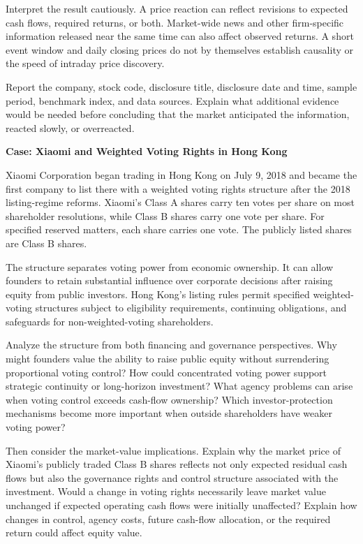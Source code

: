 Interpret the result cautiously. A price reaction can reflect revisions to expected cash flows, required returns, or both. Market-wide news and other firm-specific information released near the same time can also affect observed returns. A short event window and daily closing prices do not by themselves establish causality or the speed of intraday price discovery.

Report the company, stock code, disclosure title, disclosure date and time, sample period, benchmark index, and data sources. Explain what additional evidence would be needed before concluding that the market anticipated the information, reacted slowly, or overreacted.



\textbf{Case: Xiaomi and Weighted Voting Rights in Hong Kong}

Xiaomi Corporation began trading in Hong Kong on July 9, 2018 and became the first company to list there with a weighted voting rights structure after the 2018 listing-regime reforms. Xiaomi's Class A shares carry ten votes per share on most shareholder resolutions, while Class B shares carry one vote per share. For specified reserved matters, each share carries one vote. The publicly listed shares are Class B shares.

The structure separates voting power from economic ownership. It can allow founders to retain substantial influence over corporate decisions after raising equity from public investors. Hong Kong's listing rules permit specified weighted-voting structures subject to eligibility requirements, continuing obligations, and safeguards for non-weighted-voting shareholders.

Analyze the structure from both financing and governance perspectives. Why might founders value the ability to raise public equity without surrendering proportional voting control? How could concentrated voting power support strategic continuity or long-horizon investment? What agency problems can arise when voting control exceeds cash-flow ownership? Which investor-protection mechanisms become more important when outside shareholders have weaker voting power?

Then consider the market-value implications. Explain why the market price of Xiaomi's publicly traded Class B shares reflects not only expected residual cash flows but also the governance rights and control structure associated with the investment. Would a change in voting rights necessarily leave market value unchanged if expected operating cash flows were initially unaffected? Explain how changes in control, agency costs, future cash-flow allocation, or the required return could affect equity value.

